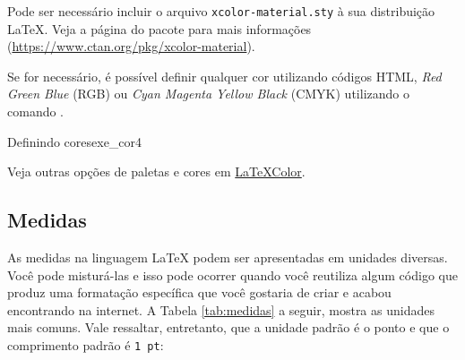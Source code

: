 \begin{marker}
  Pode ser necessário incluir o arquivo {\tt xcolor-material.sty} à sua distribuição \LaTeX{}. Veja a página do pacote para mais informações (\url{https://www.ctan.org/pkg/xcolor-material}).
\end{marker}

Se for necessário, é possível definir qualquer cor utilizando códigos HTML, \textit{Red Green Blue} (RGB) ou \textit{Cyan Magenta Yellow Black} (CMYK) utilizando o comando \texttt{\definecolor}.

\begin{texexptitled}[breakable,center lower,enhanced,middle=2mm]{Definindo cores}{exe_cor4}

\end{texexptitled}

\begin{marker}
Veja outras opções de paletas e cores em \href{http://latexcolor.com}{LaTeXColor}.
\end{marker}

\subsection{Medidas}
\label{sec:medidas}

As medidas na linguagem \LaTeX{} podem ser apresentadas em unidades diversas. Você pode misturá-las e isso pode ocorrer quando você reutiliza algum código que produz uma formatação específica que você gostaria de criar e acabou encontrando na internet. A Tabela \ref{tab:medidas} a seguir, mostra as unidades mais comuns. Vale ressaltar, entretanto, que a unidade padrão é o ponto e que o comprimento padrão é \texttt{1 pt}:

